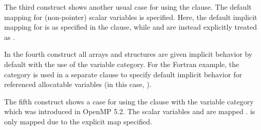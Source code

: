 The third  construct shows another usual case for using the
 clause.  The default mapping for (non-pointer) scalar
variables is specified.  Here, the default implicit mapping for  is
 as specified in the  clause, while 
and  are instead explicitly treated as .

In the fourth  construct all arrays and structures are given
 implicit behavior by default with the use of the
 variable category.  For the Fortran example, the
 category is used in a separate  clause to
specify default  implicit behavior for referenced
allocatable variables (in this case, ).

The fifth  construct shows a case for using the
 clause with the  variable category which was introduced in 
OpenMP 5.2. The scalar variables  and  are mapped . 
 is only mapped  due to the explicit map specified.

{}

